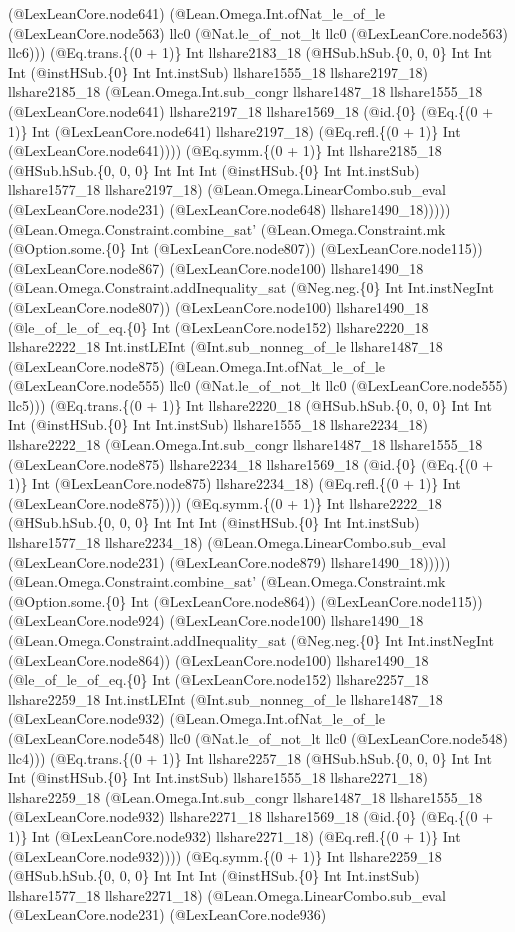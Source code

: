 \documentclass[11pt]{article}
\begin{document}
(@LexLeanCore.node641) (@Lean.Omega.Int.ofNat\_le\_of\_le (@LexLeanCore.node563) llc0 (@Nat.le\_of\_not\_lt llc0 (@LexLeanCore.node563) llc6))) (@Eq.trans.\{(0 + 1)\} Int llshare2183\_18 (@HSub.hSub.\{0, 0, 0\} Int Int Int (@instHSub.\{0\} Int Int.instSub) llshare1555\_18 llshare2197\_18) llshare2185\_18 (@Lean.Omega.Int.sub\_congr llshare1487\_18 llshare1555\_18 (@LexLeanCore.node641) llshare2197\_18 llshare1569\_18 (@id.\{0\} (@Eq.\{(0 + 1)\} Int (@LexLeanCore.node641) llshare2197\_18) (@Eq.refl.\{(0 + 1)\} Int (@LexLeanCore.node641)))) (@Eq.symm.\{(0 + 1)\} Int llshare2185\_18 (@HSub.hSub.\{0, 0, 0\} Int Int Int (@instHSub.\{0\} Int Int.instSub) llshare1577\_18 llshare2197\_18) (@Lean.Omega.LinearCombo.sub\_eval (@LexLeanCore.node231) (@LexLeanCore.node648) llshare1490\_18))))) (@Lean.Omega.Constraint.combine\_sat' (@Lean.Omega.Constraint.mk (@Option.some.\{0\} Int (@LexLeanCore.node807)) (@LexLeanCore.node115)) (@LexLeanCore.node867) (@LexLeanCore.node100) llshare1490\_18 (@Lean.Omega.Constraint.addInequality\_sat (@Neg.neg.\{0\} Int Int.instNegInt (@LexLeanCore.node807)) (@LexLeanCore.node100) llshare1490\_18 (@le\_of\_le\_of\_eq.\{0\} Int (@LexLeanCore.node152) llshare2220\_18 llshare2222\_18 Int.instLEInt (@Int.sub\_nonneg\_of\_le llshare1487\_18 (@LexLeanCore.node875) (@Lean.Omega.Int.ofNat\_le\_of\_le (@LexLeanCore.node555) llc0 (@Nat.le\_of\_not\_lt llc0 (@LexLeanCore.node555) llc5))) (@Eq.trans.\{(0 + 1)\} Int llshare2220\_18 (@HSub.hSub.\{0, 0, 0\} Int Int Int (@instHSub.\{0\} Int Int.instSub) llshare1555\_18 llshare2234\_18) llshare2222\_18 (@Lean.Omega.Int.sub\_congr llshare1487\_18 llshare1555\_18 (@LexLeanCore.node875) llshare2234\_18 llshare1569\_18 (@id.\{0\} (@Eq.\{(0 + 1)\} Int (@LexLeanCore.node875) llshare2234\_18) (@Eq.refl.\{(0 + 1)\} Int (@LexLeanCore.node875)))) (@Eq.symm.\{(0 + 1)\} Int llshare2222\_18 (@HSub.hSub.\{0, 0, 0\} Int Int Int (@instHSub.\{0\} Int Int.instSub) llshare1577\_18 llshare2234\_18) (@Lean.Omega.LinearCombo.sub\_eval (@LexLeanCore.node231) (@LexLeanCore.node879) llshare1490\_18))))) (@Lean.Omega.Constraint.combine\_sat' (@Lean.Omega.Constraint.mk (@Option.some.\{0\} Int (@LexLeanCore.node864)) (@LexLeanCore.node115)) (@LexLeanCore.node924) (@LexLeanCore.node100) llshare1490\_18 (@Lean.Omega.Constraint.addInequality\_sat (@Neg.neg.\{0\} Int Int.instNegInt (@LexLeanCore.node864)) (@LexLeanCore.node100) llshare1490\_18 (@le\_of\_le\_of\_eq.\{0\} Int (@LexLeanCore.node152) llshare2257\_18 llshare2259\_18 Int.instLEInt (@Int.sub\_nonneg\_of\_le llshare1487\_18 (@LexLeanCore.node932) (@Lean.Omega.Int.ofNat\_le\_of\_le (@LexLeanCore.node548) llc0 (@Nat.le\_of\_not\_lt llc0 (@LexLeanCore.node548) llc4))) (@Eq.trans.\{(0 + 1)\} Int llshare2257\_18 (@HSub.hSub.\{0, 0, 0\} Int Int Int (@instHSub.\{0\} Int Int.instSub) llshare1555\_18 llshare2271\_18) llshare2259\_18 (@Lean.Omega.Int.sub\_congr llshare1487\_18 llshare1555\_18 (@LexLeanCore.node932) llshare2271\_18 llshare1569\_18 (@id.\{0\} (@Eq.\{(0 + 1)\} Int (@LexLeanCore.node932) llshare2271\_18) (@Eq.refl.\{(0 + 1)\} Int (@LexLeanCore.node932)))) (@Eq.symm.\{(0 + 1)\} Int llshare2259\_18 (@HSub.hSub.\{0, 0, 0\} Int Int Int (@instHSub.\{0\} Int Int.instSub) llshare1577\_18 llshare2271\_18) (@Lean.Omega.LinearCombo.sub\_eval (@LexLeanCore.node231) (@LexLeanCore.node936) 
\end{document}
